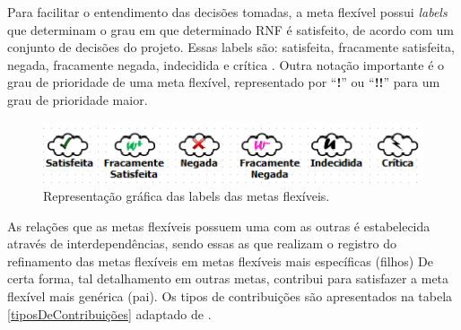 Para facilitar o entendimento das decisões tomadas, a meta flexível possui \textit{labels} que determinam o grau em que determinado RNF é satisfeito, de acordo com um conjunto de decisões do projeto. Essas labels são: satisfeita, fracamente satisfeita,  negada, fracamente negada, indecidida e crítica \cite{chung2012non}. Outra notação importante é o grau de prioridade de uma meta flexível, representado por “\textbf{!}” ou “\textbf{!!}” para um grau de prioridade maior.

\begin{figure}[h]
	\centering
	\includegraphics[keepaspectratio=true,scale=0.9]{figuras/labelsSoftgoals.png}
	\caption{Representação gráfica das labels das metas flexíveis.}
	\label{fig02}
\end{figure} 

As relações que as metas flexíveis possuem uma com as outras é estabelecida através de interdependências, sendo essas as que realizam o registro do refinamento das metas flexíveis em metas flexíveis mais específicas (filhos) De certa forma, tal detalhamento em outras metas, contribui para satisfazer a meta flexível mais genérica (pai). Os tipos de contribuições são apresentados na tabela \ref{tiposDeContribuições} adaptado de  \cite{chung2012non}.

